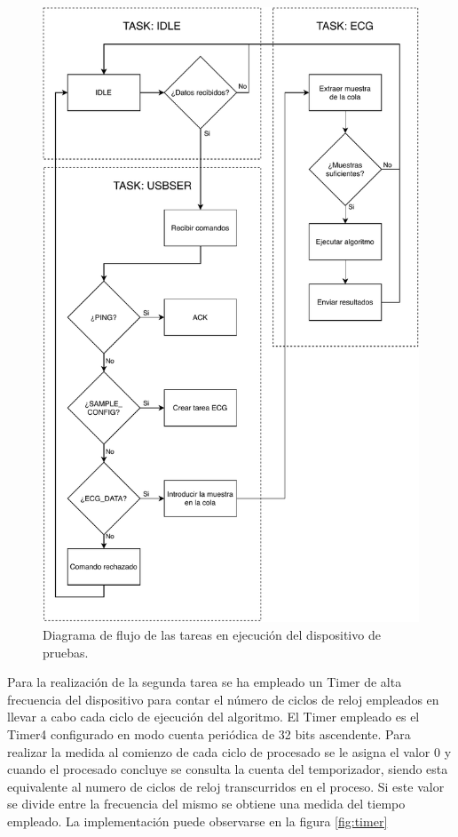         \begin{figure}
                \centering
                        \includegraphics[width = 0.78 \linewidth]{figuras/TivaWorkFlow.pdf}
                \caption{Diagrama de flujo de las tareas en ejecución del dispositivo de pruebas.}
                \label{fig:tivaFlow}
        \end{figure}
        
        Para la realización de la segunda tarea se ha empleado un Timer de alta frecuencia del dispositivo para contar el número de ciclos de reloj empleados en llevar a cabo cada ciclo de ejecución del algoritmo. El Timer empleado es el Timer4 configurado en modo cuenta periódica de 32 bits ascendente. Para realizar la medida al comienzo de cada ciclo de procesado se le asigna el valor 0 y cuando el procesado concluye se consulta la cuenta del temporizador, siendo esta equivalente al numero de ciclos de reloj transcurridos en el proceso. Si este valor se divide entre la frecuencia del mismo se obtiene una medida del tiempo empleado. La implementación puede observarse en la figura \ref{fig:timer}
        

